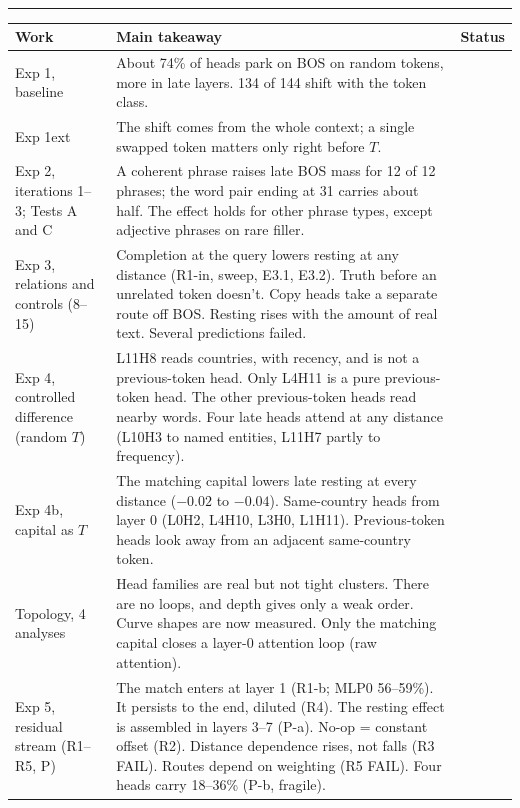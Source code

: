 \documentclass[10pt]{article}
\newcommand{\head}[1]{\par\vspace{5pt}{\large\bfseries #1}\\[-4pt]\rule{\linewidth}{0.5pt}\par}
\newcommand{\solid}{\leavevmode{\color{cgreen}\bfseries solid}}  %
\newcommand{\mixed}{\leavevmode{\color{corange}\bfseries mixed}}
\begin{document}
\head{Everything at a glance}
{\small
\begin{tabularx}{\linewidth}{@{}>{\raggedright\arraybackslash}p{2.4cm} >{\raggedright\arraybackslash}X >{\raggedright\arraybackslash}p{1.25cm}@{}}
\textbf{Work} & \textbf{Main takeaway} & \textbf{Status} \\ \hline
Exp 1, baseline & About 74\% of heads park on BOS on random tokens, more in late layers. 134 of 144 shift with the token class. & \solid \\
Exp 1ext & The shift comes from the whole context; a single swapped token matters only right before $T$. & \solid \\
Exp 2, iterations 1--3; Tests A and C & A coherent phrase raises late BOS mass for 12 of 12 phrases; the word pair ending at 31 carries about half. The effect holds for other phrase types, except adjective phrases on rare filler. & \solid \\
Exp 3, relations and controls (8--15) & Completion at the query lowers resting at any distance (R1-in, sweep, E3.1, E3.2). Truth before an unrelated token doesn't. Copy heads take a separate route off BOS. Resting rises with the amount of real text. Several predictions failed. & \mixed \\
Exp 4, controlled difference (random $T$) & L11H8 reads countries, with recency, and is not a previous-token head. Only L4H11 is a pure previous-token head. The other previous-token heads read nearby words. Four late heads attend at any distance (L10H3 to named entities, L11H7 partly to frequency). & \solid \\
Exp 4b, capital as $T$ & The matching capital lowers late resting at every distance ($-0.02$ to $-0.04$). Same-country heads from layer 0 (L0H2, L4H10, L3H0, L1H11). Previous-token heads look away from an adjacent same-country token. & \solid \\
Topology, 4 analyses & Head families are real but not tight clusters. There are no loops, and depth gives only a weak order. Curve shapes are now measured. Only the matching capital closes a layer-0 attention loop (raw attention). & \mixed \\
Exp 5, residual stream (R1--R5, P) & The match enters at layer 1 (R1-b; MLP0 56--59\%). It persists to the end, diluted (R4). The resting effect is assembled in layers 3--7 (P-a). No-op = constant offset (R2). Distance dependence rises, not falls (R3 FAIL). Routes depend on weighting (R5 FAIL). Four heads carry 18--36\% (P-b, fragile). & \mixed \\
\end{tabularx}}
\end{document}
